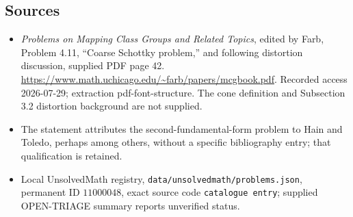 \documentclass[11pt]{article}
\begin{document}
\subsection{Sources}
\begin{itemize}
\item \emph{Problems on Mapping Class Groups and Related Topics}, edited by Farb, Problem 4.11, ``Coarse Schottky problem,'' and following distortion discussion, supplied PDF page 42. \url{https://www.math.uchicago.edu/~farb/papers/mcgbook.pdf}. Recorded access 2026-07-29; extraction pdf-font-structure. The cone definition and Subsection 3.2 distortion background are not supplied.
\item The statement attributes the second-fundamental-form problem to Hain and Toledo, perhaps among others, without a specific bibliography entry; that qualification is retained.
\item Local UnsolvedMath registry, \texttt{data/unsolvedmath/problems.json}, permanent ID \(11000048\), exact source code \texttt{catalogue entry}; supplied OPEN-TRIAGE summary reports unverified status.
\end{itemize}
\end{document}
